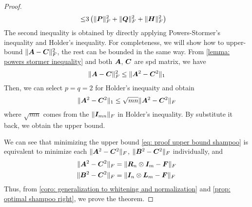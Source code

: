 \begin{proof}
\begin{align*}
    \leq& 3\left(\Vert{\bm{P}}\Vert_F^2+\Vert{\bm{Q}}\Vert_F^2+\Vert{\bm{H}}\Vert_F^2\right)
\end{align*}
The second inequality is obtained by directly applying Powers-Stormer's inequality and Holder's inequality. For completeness, we will show how to upper-bound $\Vert{\bm{A}}-{\bm{C}}\Vert_F^2$, the rest can be bounded in the same way. 
From \cref{lemma: powers stormer inequality} and both ${\bm{A}}$, ${\bm{C}}$ are \gls{spd} matrix, we have
\begin{align*}
    \Vert{\bm{A}}-{\bm{C}}\Vert_F^2\leq \Vert{\bm{A}}^2-{\bm{C}}^2\Vert_1
\end{align*}
Then, we can select $p=q=2$ for Holder's inequaity and obtain
\begin{align*}
    \Vert{\bm{A}}^2-{\bm{C}}^2\Vert_1\leq \sqrt{mn}\Vert{\bm{A}}^2-{\bm{C}}^2\Vert_F
\end{align*}
where $\sqrt{mn}$ comes from the $\Vert{\bm{I}}_{mn}\Vert_F$ in Holder's inequality. By substitute it back, we obtain the upper bound.

We can see that minimizing the upper bound \cref{eq: proof upper bound shampoo} is equivalent to minimize each $\Vert{\bm{A}}^2-{\bm{C}}^2\Vert_F$, $\Vert{\bm{B}}^2-{\bm{C}}^2\Vert_F$ individually, and 
\begin{align*}
    \Vert{\bm{A}}^2-{\bm{C}}^2\Vert_F &= \Vert{\bm{R}}_n\otimes {\bm{I}}_m - {\bm{F}}\Vert_F\\
    \Vert{\bm{B}}^2-{\bm{C}}^2\Vert_F &= \Vert{\bm{I}}_n\otimes {\bm{L}}_m-{\bm{F}}\Vert_F
\end{align*}
Thus, from \cref{coro: generalization to whitening and normalization} and \cref{prop: optimal shampoo right}, we prove the theorem. 
\end{proof}
